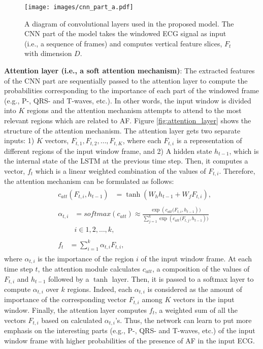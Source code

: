 \documentclass[conference]{IEEEtran}
\begin{document}
\begin{figure}[htb]
\centering
\texttt{[image: images/cnn\_part\_a.pdf]}
  \caption{A diagram of convolutional layers used in the proposed model. The CNN part of the model takes the windowed ECG signal as input (i.e., a sequence of frames) and computes vertical feature slices, $F_t$ with dimension $D$.}
  \label{fig:cnn_part}

\end{figure}

\noindent\textbf{Attention layer (i.e., a soft attention mechanism)}: The extracted features of the CNN part are sequentially passed to the attention layer to compute the probabilities corresponding to the importance of each part of the windowed frame (e.g., P-, QRS- and T-waves, etc.). In other words, the input window is divided into $K$ regions and the attention mechanism attempts to attend to the most relevant regions which are related to AF. Figure \ref{fig:attention_layer} shows the structure of the attention mechanism. The attention layer gets two separate inputs: 1) $K$ vectors, $F_{t,1},F_{t,2}, \ldots ,F_{t,K}$, where each $F_{t,i}$ is a representation of different regions of the input window frame, and 2) A hidden state $h_{t-1}$, which is the internal state of the LSTM at the previous time step. Then, it computes a vector, $f_t$ which is a linear weighted combination of the values of $F_{t,i}$. Therefore, the attention mechanism can be formulated as follows:
\begin{align}
  &\begin{aligned}
    c_{att}(F_{t,i},h_{t-1}) & =\tanh({W_{h}} h_{t-1}+{W_{f}} F_{t,i}),
  \end{aligned}\\
  &\begin{aligned}
    \alpha_{t,i} & = softmax(c_{att}) \approx  \frac{\exp({c_{att}(F_{t,i},h_{t-1}}))}{\sum_{j=1}^{k} \exp({c_{att}(F_{t,j},h_{t-1}}))} \\
      & i \in 1,2,\ldots ,{k},
  \end{aligned} \\
    &\begin{aligned}
   f_t & =\sum_{i=1}^{k} \alpha_{t,i} F_{t,i},
  \end{aligned}
\end{align}
where $\alpha_{t,i}$ is the importance of the region $i$ of the input window frame.
At each time step $t$, the attention module calculates $c_{att}$, a composition of the values of $F_{t,i}$ and $h_{t-1}$ followed by a $\tanh$ layer. Then, it is passed to a softmax layer to compute $\alpha_{t,i}$ over ${k}$ regions. Indeed, each $\alpha_{t,i}$ is considered as the amount of importance of the corresponding vector $F_{t,i}$ among ${K}$ vectors in the input window. Finally, the attention layer computes $f_t$, a weighted sum of all the vectors $F_{t,i}$ based on calculated $\alpha_{t,i}$'s. Thus, the network can learn to put more emphasis on the interesting parts (e.g., P-, QRS- and T-waves, etc.) of the input window frame with higher probabilities of the presence of AF in the input ECG.
\end{document}
